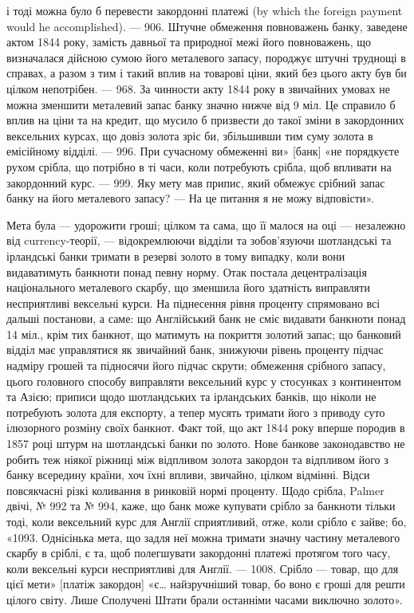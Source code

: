 \parcont{}  %
і тоді можна було б перевести закордонні платежі (by which the foreign payment
would he accomplished). — 906. Штучне обмеження повноважень банку, заведене
актом 1844 року, замість давньої та природної межі його повноважень, що визначалася
дійсною сумою його металевого запасу, породжує штучні труднощі в
справах, а разом з тим і такий вплив на товарові ціни, який без цього акту
був би цілком непотрібен. — 968. За чинности акту 1844 року в звичайних
умовах не можна зменшити металевий запас банку значно нижче від 9 міл.
Це справило б вплив на ціни та на кредит, що мусило б призвести до такої
зміни в закордонних вексельних курсах, що довіз золота зріс би, збільшивши
тим суму золота в емісійному відділі. — 996. При сучасному обмеженні ви»
[банк] «не порядкуєте рухом срібла, що потрібно в ті часи, коли потребують
срібла, щоб впливати на закордонний курс. — 999. Яку мету мав припис, який
обмежує срібний запас банку на  його металевого запасу? — На це питання
я не можу відповісти».

Мета була — удорожити гроші; цілком та сама, що її малося на оці —
незалежно від currency-теорії, — відокремлюючи відділи та зобов’язуючи шотландські
та ірландські банки тримати в резерві золото в тому випадку, коли
вони видаватимуть банкноти понад певну норму. Отак постала децентралізація
національного металевого скарбу, що зменшила його здатність виправляти несприятливі
вексельні курси. На піднесення рівня проценту спрямовано всі дальші
постанови, а саме: що Англійський банк не сміє видавати банкноти понад 14 міл.,
крім тих банкнот, що матимуть на покриття золотий запас; що банковий відділ має
управлятися як звичайний банк, знижуючи рівень проценту підчас надміру
грошей та підносячи його підчас скрути; обмеження срібного запасу, цього
головного способу виправляти вексельний курс у стосунках з континентом та
Азією; приписи щодо шотландських та ірландських банків, що ніколи не потребують
золота для експорту, а тепер мусять тримати його з приводу суто ілюзорного
розміну своїх банкнот. Факт той, що акт 1844 року вперше породив
в 1857 році штурм на шотландські банки по золото. Нове банкове
законодавство не робить теж ніякої ріжниці між відпливом золота закордон та
відпливом його з банку всередину країни, хоч їхні впливи, звичайно, цілком
відмінні. Відси повсякчасні різкі коливання в ринковій нормі проценту. Щодо
срібла, Palmer двічі, № 992 та № 994, каже, що банк може купувати срібло
за банкноти тільки тоді, коли вексельний курс для Англії сприятливий, отже,
коли срібло є зайве; бо, «1093. Однісінька мета, що задля неї можна тримати
значну частину металевого скарбу в сріблі, є та, щоб полегшувати закордонні
платежі протягом того часу, коли вексельні курси несприятливі для Англії. —
1008. Срібло — товар, що для цієї мети» [платіж закордон] «є\dots{} найзручніший
товар, бо воно є гроші для решти цілого світу. Лише Сполучені Штати брали
останніми часами виключно золото».

